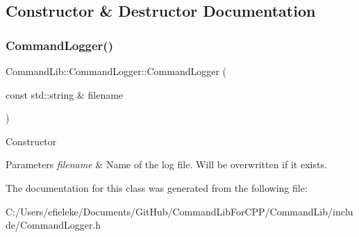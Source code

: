 \subsection{Constructor \& Destructor Documentation}
\mbox{\label{class_command_lib_1_1_command_logger_ac655a681d1601506900d1a9e879a09e3}} 
\subsubsection{\texorpdfstring{Command\+Logger()}{CommandLogger()}}
{\footnotesize\ttfamily Command\+Lib\+::\+Command\+Logger\+::\+Command\+Logger (\begin{DoxyParamCaption}\item[{const std\+::string \&}]{filename }\end{DoxyParamCaption})\hspace{0.3cm}{\ttfamily [explicit]}}



Constructor


\begin{DoxyParams}{Parameters}
{\em filename} & Name of the log file. Will be overwritten if it exists.\\
\hline
\end{DoxyParams}


The documentation for this class was generated from the following file\+:\begin{DoxyCompactItemize}
\item 
C\+:/\+Users/efieleke/\+Documents/\+Git\+Hub/\+Command\+Lib\+For\+C\+P\+P/\+Command\+Lib/include/Command\+Logger.\+h\end{DoxyCompactItemize}
